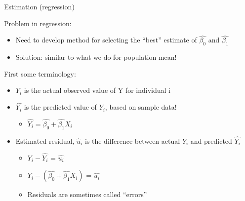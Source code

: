 \documentclass[
  8pt,
  ignorenonframetext,
  dvipsnames]{beamer}
\providecommand{\tightlist}{%
  \setlength{\itemsep}{0pt}\setlength{\parskip}{0pt}}
\let\olditem\item
\renewcommand{\item}{%
  \olditem\vspace{4pt}
}
\begin{document}
\begin{frame}{Estimation (regression)}
\protect\hypertarget{estimation-regression}{}

Problem in regression:

\begin{itemize}
\tightlist
\item
  Need to develop method for selecting the ``best'' estimate of
  \(\hat{\beta_0}\) and \(\hat{\beta_1}\)
\item
  Solution: similar to what we do for population mean!
\end{itemize}

\medskip

First some terminology:

\begin{itemize}
\tightlist
\item
  \(Y_i\) is the actual observed value of Y for individual i
\item
  \(\hat{Y_i}\) is the predicted value of \(Y_i\), based on sample data!

  \begin{itemize}
  \tightlist
  \item
    \(\hat{Y_i} = \hat{\beta_0} + \hat{\beta_1}X_i\)
  \end{itemize}
\item
  Estimated residual, \(\hat{u}_i\) is the difference between actual
  \(Y_i\) and predicted \(\hat{Y_i}\)

  \begin{itemize}
  \tightlist
  \item
    \(Y_i - \hat{Y_i}\) = \(\hat{u_i}\)
  \item
    \(Y_i - (\hat{\beta_0} + \hat{\beta_1}X_i)\) = \(\hat{u_i}\)
  \item
    Residuals are sometimes called ``errors''
  \end{itemize}
\end{itemize}

\end{frame}
\end{document}
